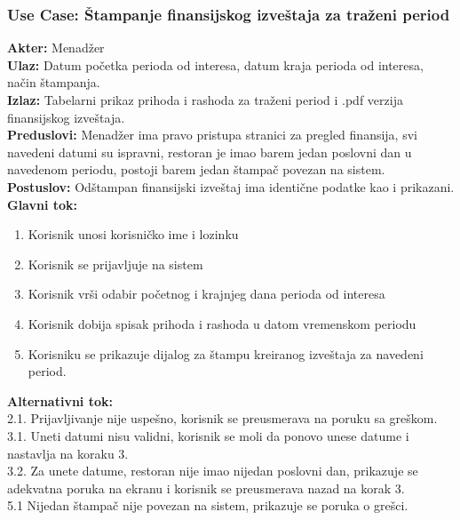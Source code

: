 \documentclass{article}
\begin{document}
\subsubsection{\textbf{Use Case}: Štampanje finansijskog izveštaja za traženi period}
\textbf{Akter:} Menadžer\\
\textbf{Ulaz:} Datum početka perioda od interesa, datum kraja perioda od interesa, način štampanja.\\
\textbf{Izlaz:} Tabelarni prikaz prihoda i rashoda za traženi period i .pdf verzija finansijskog izveštaja.\\
\textbf{Preduslovi:} Menadžer ima pravo pristupa stranici za pregled finansija, svi navedeni datumi su ispravni, restoran je imao barem jedan poslovni dan u navedenom periodu, postoji barem jedan štampač povezan na sistem.\\
\textbf{Postuslov:} Odštampan finansijski izveštaj ima identične podatke kao i prikazani.\\
\textbf{Glavni tok:}
\begin{enumerate}
\item Korisnik unosi korisničko ime i lozinku
\item Korisnik se prijavljuje na sistem
\item Korisnik vrši odabir početnog i krajnjeg dana perioda od interesa
\item Korisnik dobija spisak prihoda i rashoda u datom vremenskom periodu
\item Korisniku se prikazuje dijalog za štampu kreiranog izveštaja za navedeni period.
\end{enumerate}
\textbf{Alternativni tok:}\\
        2.1. Prijavljivanje nije uspešno, korisnik se preusmerava na poruku sa greškom.\\
        3.1. Uneti datumi nisu validni, korisnik se moli da ponovo unese datume i nastavlja na koraku 3.\\
        3.2. Za unete datume, restoran nije imao nijedan poslovni dan, prikazuje se adekvatna poruka na ekranu i korisnik se preusmerava nazad na korak 3.\\
        5.1 Nijedan štampač nije povezan na sistem, prikazuje se poruka o grešci.
       
\end{document}
